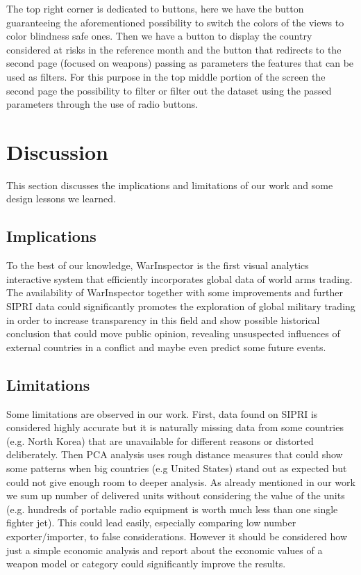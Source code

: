 \documentclass{article}
\begin{document}
\begin{multicols}{2}
The top right corner is dedicated to buttons, here we have the
button guaranteeing the aforementioned possibility to switch the colors of the views to color blindness safe ones. Then we have a button to display the country considered at risks in the reference month and the button that redirects to the second page (focused on weapons) passing as parameters the features that can be used as filters.
For this purpose in the top middle portion of the screen the second page the possibility to filter or filter out the dataset using the passed parameters through the use of radio buttons.


\section{Discussion}

This section discusses the implications and limitations of our work and some design lessons we learned.
\subsection{Implications}
To the best of our knowledge, WarInspector is the first visual analytics interactive system that efficiently incorporates  global data of world arms trading. The availability of WarInspector together with some improvements and further SIPRI data could significantly promotes the exploration of global military trading in order to increase transparency in this field and show possible historical conclusion that could move public opinion, revealing unsuspected influences of external countries in a conflict and maybe even predict some future events. 

\subsection{Limitations}

Some limitations are observed in our work. First, data found on SIPRI is considered highly accurate but it is naturally missing data from some countries (e.g. North Korea) that are unavailable for different reasons or distorted deliberately. Then PCA analysis uses rough distance measures that could show some patterns when big countries (e.g United States) stand out as expected but could not give enough room to deeper analysis.
As already mentioned in our work we sum up number of delivered units without considering the value of the units (e.g. hundreds of portable radio equipment is worth much less than one single fighter jet). This could lead easily, especially comparing low number exporter/importer, to false considerations. However it should be considered how just a simple economic analysis and report about the economic values of a weapon model or category could significantly improve the results.





\end{multicols}
\end{document}
